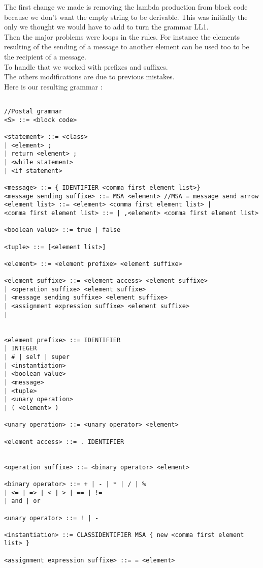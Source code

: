 \documentclass{eplDoc}
\begin{document}
The first change we made is removing the lambda production from block code because we don't want the empty string to be derivable.  This was initially the only we thought we would have to add to turn the grammar LL1.
\\
Then the major problems were loops in the rules. For instance the elements resulting of the sending of a message to another element can be used too to be the recipient of a message. \\
To handle that we worked with prefixes and suffixes.\\
The others modifications are due to previous mistakes.\\
Here is our resulting grammar : 
\begin{lstlisting}
    
//Postal grammar
<S> ::= <block code>

<statement> ::= <class>
| <element> ;
| return <element> ;
| <while statement>
| <if statement>

<message> ::= { IDENTIFIER <comma first element list>}
<message sending suffixe> ::= MSA <element> //MSA = message send arrow
<element list> ::= <element> <comma first element list> | 
<comma first element list> ::= | ,<element> <comma first element list>

<boolean value> ::= true | false

<tuple> ::= [<element list>]

<element> ::= <element prefixe> <element suffixe>

<element suffixe> ::= <element access> <element suffixe>
| <operation suffixe> <element suffixe>
| <message sending suffixe> <element suffixe>
| <assignment expression suffixe> <element suffixe>
| 


<element prefixe> ::= IDENTIFIER
| INTEGER
| # | self | super
| <instantiation>
| <boolean value>
| <message>
| <tuple>
| <unary operation>
| ( <element> )

<unary operation> ::= <unary operator> <element>

<element access> ::= . IDENTIFIER


<operation suffixe> ::= <binary operator> <element>

<binary operator> ::= + | - | * | / | % 
| <= | => | < | > | == | != 
| and | or

<unary operator> ::= ! | - 

<instantiation> ::= CLASSIDENTIFIER MSA { new <comma first element list> }

<assignment expression suffixe> ::= = <element>


\end{lstlisting}
\end{document}
